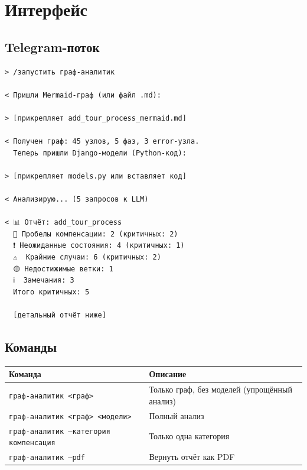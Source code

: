 \documentclass[11pt, a4paper, oneside]{article}
\begin{document}
\section{Интерфейс}

\subsection{Telegram-поток}

\begin{lstlisting}[language={}, numbers=none, caption={Пример диалога}]
> /запустить граф-аналитик

< Пришли Mermaid-граф (или файл .md):

> [прикрепляет add_tour_process_mermaid.md]

< Получен граф: 45 узлов, 5 фаз, 3 error-узла.
  Теперь пришли Django-модели (Python-код):

> [прикрепляет models.py или вставляет код]

< Анализирую... (5 запросов к LLM)

< 📊 Отчёт: add_tour_process
  🔴 Пробелы компенсации: 2 (критичных: 2)
  ❗ Неожиданные состояния: 4 (критичных: 1)
  ⚠️  Крайние случаи: 6 (критичных: 2)
  🟡 Недостижимые ветки: 1
  ℹ️  Замечания: 3
  Итого критичных: 5

  [детальный отчёт ниже]
\end{lstlisting}

\subsection{Команды}

\begin{center}
\begin{tabular}{lp{9cm}}
  \toprule
  \textbf{Команда} & \textbf{Описание} \\
  \midrule
  \texttt{граф-аналитик <граф>} & Только граф, без моделей (упрощённый анализ) \\
  \texttt{граф-аналитик <граф> <модели>} & Полный анализ \\
  \texttt{граф-аналитик --категория компенсация} & Только одна категория \\
  \texttt{граф-аналитик --pdf} & Вернуть отчёт как PDF \\
  \bottomrule
\end{tabular}
\end{center}

\end{document}
